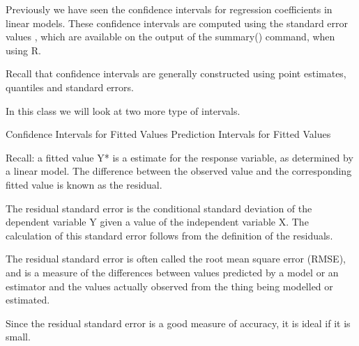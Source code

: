 Previously we have seen the confidence intervals for regression coefficients in linear models. These 
confidence intervals are computed using the standard error values , which are available on the 
output of the summary() command, when using R. 
 
Recall that confidence intervals are generally constructed using point estimates, quantiles and 
standard errors. 
 
 In this class we will look at two more type of intervals. 
 
 Confidence Intervals for Fitted Values 
 Prediction Intervals for Fitted Values 
 
Recall: a fitted value Y* is a estimate for the response variable, as determined by a linear model. The 
difference between the observed value and the corresponding fitted value is known as the residual. 
 
The residual standard error is the conditional standard deviation of the dependent variable Y given a 
value of the independent variable X. The calculation of this standard error follows from the 
definition of the residuals. 
 
 
The residual standard error is often called the root mean square error (RMSE), and is a measure of 
the differences between values predicted by a model or an estimator and the values actually 
observed from the thing being modelled or estimated. 
 
Since the residual standard error is a good measure of accuracy, it is ideal if it is small. 
